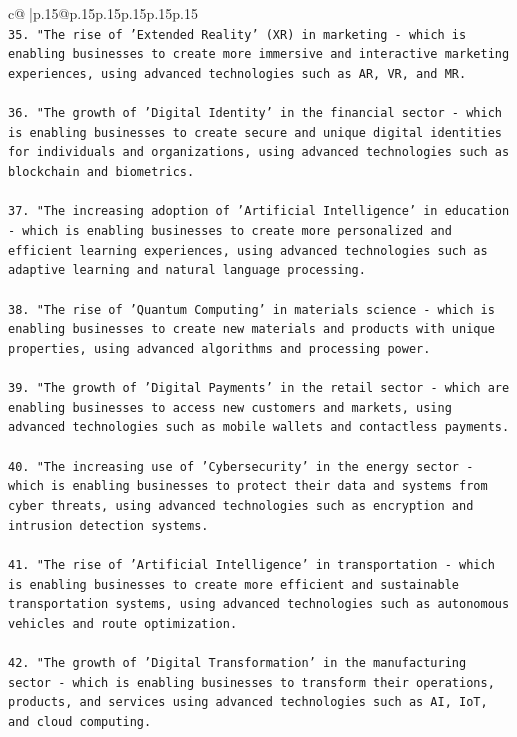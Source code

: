 \documentclass{article}
\begin{document}
{\begin{supertabular}{c@{$\;$}|p{.15\linewidth}@{}p{.15\linewidth}p{.15\linewidth}p{.15\linewidth}p{.15\linewidth}p{.15\linewidth}}
{{{\\ 
\texttt{35. "The rise of 'Extended Reality' (XR) in marketing {-} which is enabling businesses to create more immersive and interactive marketing experiences, using advanced technologies such as AR, VR, and MR.} \\
\\ 
\texttt{36. "The growth of 'Digital Identity' in the financial sector {-} which is enabling businesses to create secure and unique digital identities for individuals and organizations, using advanced technologies such as blockchain and biometrics.} \\
\\ 
\texttt{37. "The increasing adoption of 'Artificial Intelligence' in education {-} which is enabling businesses to create more personalized and efficient learning experiences, using advanced technologies such as adaptive learning and natural language processing.} \\
\\ 
\texttt{38. "The rise of 'Quantum Computing' in materials science {-} which is enabling businesses to create new materials and products with unique properties, using advanced algorithms and processing power.} \\
\\ 
\texttt{39. "The growth of 'Digital Payments' in the retail sector {-} which are enabling businesses to access new customers and markets, using advanced technologies such as mobile wallets and contactless payments.} \\
\\ 
\texttt{40. "The increasing use of 'Cybersecurity' in the energy sector {-} which is enabling businesses to protect their data and systems from cyber threats, using advanced technologies such as encryption and intrusion detection systems.} \\
\\ 
\texttt{41. "The rise of 'Artificial Intelligence' in transportation {-} which is enabling businesses to create more efficient and sustainable transportation systems, using advanced technologies such as autonomous vehicles and route optimization.} \\
\\ 
\texttt{42. "The growth of 'Digital Transformation' in the manufacturing sector {-} which is enabling businesses to transform their operations, products, and services using advanced technologies such as AI, IoT, and cloud computing.} \\
\\ 
}}}
\end{supertabular}}
\end{document}
